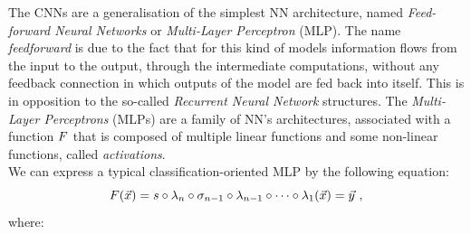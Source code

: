 The CNNs are a generalisation of the simplest NN architecture, named \emph{Feed-forward Neural Networks} or \emph{Multi-Layer Perceptron} (MLP). The name \emph{feedforward} is due to the fact that for this kind of models information flows from  the input to the output, through the intermediate computations, without any feedback connection in which outputs of the model are fed back into itself. This is in opposition to the so-called \emph{Recurrent Neural Network} structures. The {\em Multi-Layer Perceptrons} (MLPs) are a family of NN's architectures, associated with a function $F$  that is composed of multiple linear functions and some non-linear functions, called {\em activations}. \\

We can express a typical classification-oriented MLP by the following equation:
\begin{equation}\label{eq:MLP}
F(\vec{x}) = s\circ\lambda_n\circ\sigma_{n-1}\circ\lambda_{n-1}\circ\dots\circ \lambda_1(\vec{x})=\vec{y} \mbox{ ,}
\end{equation}
where:

